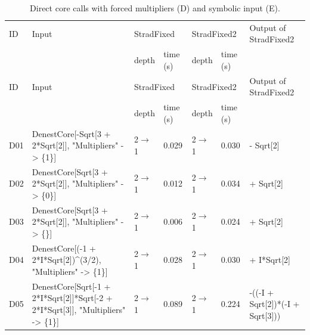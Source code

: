 \begin{longtable}{@{}p{}>{\ttfamily\footnotesize\raggedright\arraybackslash}p{}p{}p{}p{}p{}>{\ttfamily\footnotesize\raggedright\arraybackslash}p{}@{}}
\caption{Direct core calls with forced multipliers (D) and symbolic input (E).}\label{tab:cmpDE}\\
\toprule ID & Input & \multicolumn{2}{l}{StradFixed} & \multicolumn{2}{l}{StradFixed2} & Output of StradFixed2\\ & & depth & time (s) & depth & time (s) & \\\midrule\endfirsthead
\toprule ID & Input & \multicolumn{2}{l}{StradFixed} & \multicolumn{2}{l}{StradFixed2} & Output of StradFixed2\\ & & depth & time (s) & depth & time (s) & \\\midrule\endhead
\bottomrule\endfoot
D01 & DenestCore[\allowbreak{}-Sqrt[\allowbreak{}3 +\allowbreak{} 2*\allowbreak{}Sqrt[\allowbreak{}2]\allowbreak{}]\allowbreak{},\allowbreak{} "Multipliers" -> \{1\}]\allowbreak{} & 2$\to$1 & 0.029 & 2$\to$1 & 0.030 & -1 -\allowbreak{} Sqrt[\allowbreak{}2]\allowbreak{}\\
D02 & DenestCore[\allowbreak{}Sqrt[\allowbreak{}3 +\allowbreak{} 2*\allowbreak{}Sqrt[\allowbreak{}2]\allowbreak{}]\allowbreak{},\allowbreak{} "Multipliers" -> \{0\}]\allowbreak{} & 2$\to$1 & 0.012 & 2$\to$1 & 0.034 & 1 +\allowbreak{} Sqrt[\allowbreak{}2]\allowbreak{}\\
D03 & DenestCore[\allowbreak{}Sqrt[\allowbreak{}3 +\allowbreak{} 2*\allowbreak{}Sqrt[\allowbreak{}2]\allowbreak{}]\allowbreak{},\allowbreak{} "Multipliers" -> \{\}]\allowbreak{} & 2$\to$1 & 0.006 & 2$\to$1 & 0.024 & 1 +\allowbreak{} Sqrt[\allowbreak{}2]\allowbreak{}\\
D04 & DenestCore[\allowbreak{}(\allowbreak{}-1 +\allowbreak{} 2*\allowbreak{}I*\allowbreak{}Sqrt[\allowbreak{}2]\allowbreak{})\allowbreak{}\textasciicircum{}\allowbreak{}(\allowbreak{}3/\allowbreak{}2)\allowbreak{},\allowbreak{} "Multipliers" -> \{1\}]\allowbreak{} & 2$\to$1 & 0.028 & 2$\to$1 & 0.030 & -5 +\allowbreak{} I*\allowbreak{}Sqrt[\allowbreak{}2]\allowbreak{}\\
D05 & DenestCore[\allowbreak{}Sqrt[\allowbreak{}-1 +\allowbreak{} 2*\allowbreak{}I*\allowbreak{}Sqrt[\allowbreak{}2]\allowbreak{}]\allowbreak{}*\allowbreak{}Sqrt[\allowbreak{}-2 +\allowbreak{} 2*\allowbreak{}I*\allowbreak{}Sqrt[\allowbreak{}3]\allowbreak{}]\allowbreak{},\allowbreak{} "Multipliers" -> \{1\}]\allowbreak{} & 2$\to$1 & 0.089 & 2$\to$1 & 0.224 & -(\allowbreak{}(\allowbreak{}-I +\allowbreak{} Sqrt[\allowbreak{}2]\allowbreak{})\allowbreak{}*\allowbreak{}(\allowbreak{}-I +\allowbreak{} Sqrt[\allowbreak{}3]\allowbreak{})\allowbreak{})\allowbreak{}\\

\end{longtable}
